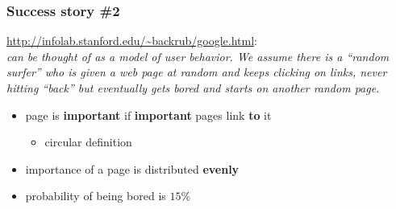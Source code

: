 \documentclass{beamer}
\begin{document}
\begin{frame}
\frametitle{Success story \#2 }
{\small
\bigskip
\url{http://infolab.stanford.edu/~backrub/google.html}: \\
\bigskip
\emph{\pagerank can be thought of as a model of user behavior. We assume there is a ``random surfer'' who is given a web page at random and keeps clicking on links, never hitting ``back'' but eventually gets bored and starts on another random page.} }
\moveb
\pause 
\begin{itemize}%
\item page is \textbf{important} if \textbf{important} pages link \textbf{to} it  
\pause 
\begin{itemize}
\item circular definition
\end{itemize}
\pause 
\item importance of a page is distributed \textbf{evenly} 
\pause 
\item probability of being bored is $15\%$
\end{itemize}

\end{frame}


\MakeLastSlide
\end{document}

